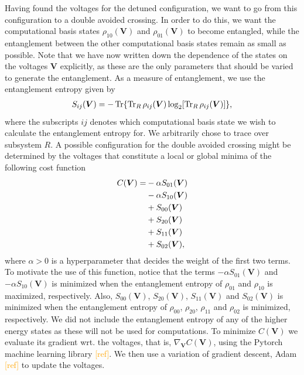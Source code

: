 \documentclass[twocolumn,superscriptaddress,unsortedaddress,
 amsmath,amssymb,
 aps,
]{revtex4-2}
\newcommand{\may}[1]{\textcolor{orange}{#1}}
\begin{document}
        
        Having found the voltages for the detuned configuration, we want to go from this configuration to a double avoided crossing. In order to do this, we want the computational basis states $\rho_{10}(\boldsymbol{V})$ and $\rho_{01}(\boldsymbol{V})$ to become entangled, while the entanglement between the other computational basis states remain as small as possible. Note that we have now written down the dependence of the states on the voltages $\boldsymbol{V}$ explicitly, as these are the only parameters that should be varied to generate the entanglement. As a measure of entanglement, we use the entanglement entropy given by
        \begin{align*}
            S_{ij}(\boldsymbol{V}) = -\Tr{\Tr_R{\rho_{ij}(\boldsymbol{V})}\log_2[\Tr_R{\rho_{ij}(\boldsymbol{V})]}},
        \end{align*}
        where the subscripts $ij$ denotes which computational basis state we wish to calculate the entanglement entropy for. We arbitrarily chose to trace over subsystem $R$.
        A possible configuration for the double avoided crossing might be determined by the voltages that constitute a local or global minima of the following cost function
        \begin{align*}
            C(\boldsymbol{V}) =& -\alpha S_{01}(\boldsymbol{V}) \notag \\
            &- \alpha S_{10}(\boldsymbol{V}) \notag \\
            &+ S_{00}(\boldsymbol{V}) \notag \\
            &+ S_{20}(\boldsymbol{V}) \notag \\
            &+ S_{11}(\boldsymbol{V}) \notag \\
            &+ S_{02}(\boldsymbol{V}),
        \end{align*}
        where $\alpha > 0$ is a hyperparameter that decides the weight of the first two terms. To motivate the use of this function, notice that the terms $-\alpha S_{01}(\boldsymbol{V})$ and $-\alpha S_{10}(\boldsymbol{V})$ is minimized when the entanglement entropy of $\rho_{01}$ and $\rho_{10}$ is maximized, respectively. Also, $S_{00}(\boldsymbol{V})$, $S_{20}(\boldsymbol{V})$, $S_{11}(\boldsymbol{V})$ and $S_{02}(\boldsymbol{V})$ is minimized when the entanglement entropy of $\rho_{00}$, $\rho_{20}$, $\rho_{11}$ and $\rho_{02}$ is minimized, respectively. We did not include the entanglement entropy of any of the higher energy states as these will not be used for computations. To minimize $C(\boldsymbol{V})$ we evaluate its gradient wrt. the voltages, that is,
        $\nabla_{\boldsymbol{V}}C(\boldsymbol{V})$, using the Pytorch machine learning library \may{[ref]}. We then use a variation of gradient descent, Adam \may{[ref]} to update the voltages.
        
\end{document}
